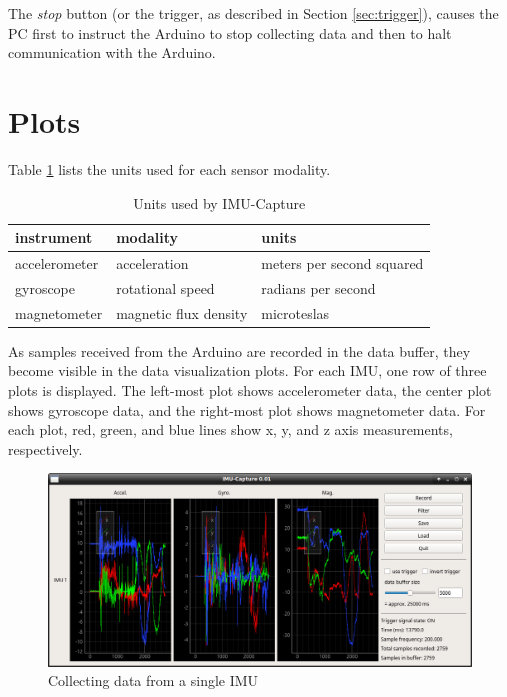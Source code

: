 \documentclass[11pt,letterpaper,article,oneside]{memoir}
\newcommand{\name}{IMU-Capture}
\begin{document}
The \emph{stop} button (or the trigger, as described in Section \ref{sec:trigger}),
causes the PC first to instruct the Arduino to stop collecting data and then to
halt communication with the Arduino.

\section{Plots}
\label{sec:plots}

Table \ref{tab:units} lists the units used for each sensor modality.

\begin{table}
\centering
\begin{tabular}{@{}*3l@{}}
\toprule
instrument & modality & units \\
\midrule 
accelerometer & acceleration          & meters per second squared \\
gyroscope     & rotational speed      & radians per second\\
magnetometer  & magnetic flux density & microteslas \\
\bottomrule
\end{tabular}
\caption{Units used by \name{}}
\label{tab:units}
\end{table}

As samples received from the Arduino are recorded in the data buffer, they
become visible in the data visualization plots. For each IMU, one row of three
plots is displayed. The left-most plot shows accelerometer data, the center plot
shows gyroscope data, and the right-most plot shows magnetometer data. For each
plot, red, green, and blue lines show x, y, and z axis measurements,
respectively.

\begin{figure}[]
    \begin{center}
        \includegraphics[width=\textwidth]{screenshot_plots}
    \end{center}
    \caption{Collecting data from a single IMU} 
\end{figure}
\end{document}
